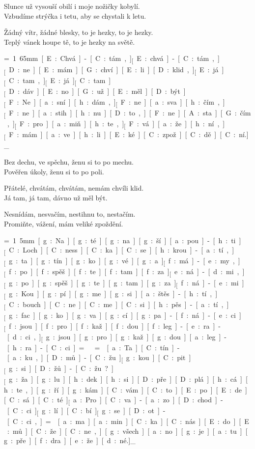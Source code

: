 Slunce už vysouší obilí i moje nožičky kobylí.\\
Vzbudíme strýčka i tetu, aby se chystali k letu.

Žádný vítr, žádné blesky, to je hezky, to je hezky.\\
Teplý vánek houpe tě, to je hezky na světě.



{\unit=1.65mm
[E:Chvá]-[C:tám,]_ [E:chvá]-[C:tám,]_
[D:ne][E:mám] [G:chví][E:li] [D:klid,]_

[E:já]_ [C:tam,]_ [E:já]_ [C:tam]_
[D:dáv][E:no] [G:už] [E:měl] [D:být.]_

[F:Ne][a:sní][h:dám,]_
[F:ne][a:sva][h:čím,]_
[F:ne][a:stih][h:nu] [D:to,] [F:ne][A:sta][G:čím,]_

[F:pro][a:miň][h:te,]_
[F:vá][a:že][h:ní,]_
[F:mám] [a:ve][h:li][E:ké] [C:zpož][C:dě][C:ní.]_
}

Bez dechu, ve spěchu, ženu si to po mechu.\\
Pověřen úkoly, ženu si to po poli.

Přátelé, chvátám, chvátám, nemám chvíli klid.\\
Já tam, já tam, dávno už měl být.

Nesnídám, nesvačím, nestihnu to, nestačím.\\
Promiňte, vážení, mám veliké zpoždění.



{\unit=1.5mm
[g:Na] [g:té] [g:na][g:ší] [a:pou]-[h:ti]_
[C:Loch][C:ness][C:ka] [C:se] [h:krou]-[a:tí,]_

[g:ta][g:tín][g:ko][g:vé] [g:a]_ [f:má]-[e:my,]_
[f:po][f:spěš][f:te] [f:tam] [f:za]_ [e:ná]-[d:mi,]_

[g:po][g:spěš][g:te] [g:tam] [g:za]_ [f:ná]-[e:mi.]_

[g:Kou][g:pí][g:me] [g:si] [a:štěs]-[h:tí,]_
[C:bouch][C:ne][C:me] [C:si] [h:pěs]-[a:tí,]_

[g:fac][g:ko][g:va][g:cí] [g:pa]-[f:ná]-[e:ci]_
[f:jsou] [f:pro] [f:kaž][f:dou] [f:leg]-[e:ra]-[d:ci,]_

[g:jsou] [g:pro] [g:kaž][g:dou] [a:leg]-[h:ra]-[C:ci.]_

\min=
\max=

[a:Ta][C:tín]-[a:ku,] [D:mů]-[C:žu]_
[g:kou][C:pit]_ [g:si] [D:žů]-[C:žu?]_

[g:ža][g:lu][h:dek] [h:si] [D:pře][D:plá][h:cá][h:te,] %
[g:ří][g:kám] [C:vám] [C:to] [E:po][E:de][C:sá][C:té.]_

[a:Pro][C:va]-[a:zo][D:chod]-[C:ci]_
[g:lí][C:bí]_ [g:se] [D:ot]-[C:ci,]_

\min=
[a:ma][a:min][C:ka] [C:nás] [E:do][E:mů] [C:že][C:ne,] %
[g:všech][a:no] [g:je] [a:tu] [g:pře][f:dra][e:že][d:né.]_
}

